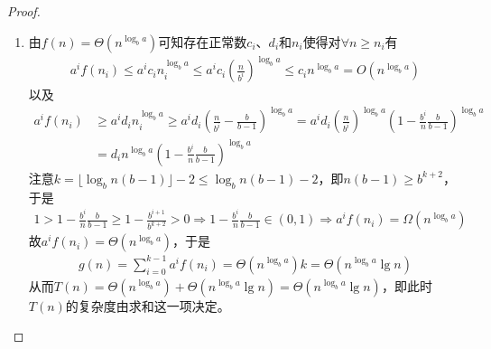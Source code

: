 \documentclass{ctexart}
\begin{document}
\begin{proof}
\begin{enumerate}
        \item 由$f(n) = \Theta (n^{\log_b a})$可知存在正常数$c_i$、$d_i$和$n_i$使得对$\forall n \ge n_i$有
              \begin{align*}
                  a^i f(n_i) \le a^i c_i n_i^{\log_b a} \le a^i c_i \left( \frac{n}{b^i} \right)^{\log_b a} \le c_i n^{\log_b a} = O(n^{\log_b a})
              \end{align*}
              以及
              \begin{align*}
                  a^i f(n_i) & \ge a^i d_i n_i^{\log_b a} \ge a^i d_i \left( \frac{n}{b^i} - \frac{b}{b-1} \right)^{\log_b a} = a^i d_i \left( \frac{n}{b^i} \right)^{\log_b a} \left( 1 - \frac{b^i}{n} \frac{b}{b-1} \right)^{\log_b a} \\
                             & = d_i n^{\log_b a} \left( 1 - \frac{b^i}{n} \frac{b}{b-1} \right)^{\log_b a}
              \end{align*}
              注意$k = \lfloor \log_b n(b-1) \rfloor - 2 \le \log_b n(b-1) - 2$，即$n(b-1) \ge b^{k+2}$，于是
              \begin{align*}
                  1 > 1 - \frac{b^i}{n} \frac{b}{b-1} \ge 1 - \frac{b^{i+1}}{b^{k+2}} > 0 \Longrightarrow 1 - \frac{b^i}{n} \frac{b}{b-1} \in (0,1) \Longrightarrow a^i f(n_i) = \Omega (n^{\log_b a})
              \end{align*}
              故$a^i f(n_i) = \Theta(n^{\log_b a})$，于是
              \begin{align*}
                  g(n) = \sum_{i=0}^{k-1} a^i f(n_i) = \Theta(n^{\log_b a}) k = \Theta(n^{\log_b a} \lg n)
              \end{align*}
              从而$T(n) = \Theta(n^{\log_b a}) + \Theta(n^{\log_b a} \lg n) = \Theta(n^{\log_b a} \lg n)$，即此时$T(n)$的复杂度由求和这一项决定。


\end{enumerate}
\end{proof}
\end{document}
